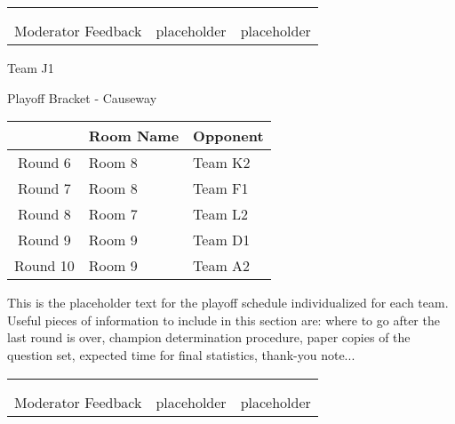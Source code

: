 \documentclass{article}%
\begin{document}
\newline%
%
\begin{tabularx}{\textwidth}{YYY}%
  &  &  \\%
\\%
Moderator Feedback&placeholder&placeholder\\%
\end{tabularx}%
\newpage%
\begin{center}%
\begin{Huge}%
Team J1%
\end{Huge}%
\vspace*{12pt}%
\linebreak%
\begin{Large}%
Playoff Bracket {-} Causeway%
\end{Large}%
\end{center}%
\vspace*{4pt}%
%
\begin{tabularx}{\textwidth}{|c|Y|Y|}%
\hline%
&Room Name&Opponent\\%
\hline%
Round 6&Room 8&Team K2\\%
Round 7&Room 8&Team F1\\%
Round 8&Room 7&Team L2\\%
Round 9&Room 9&Team D1\\%
Round 10&Room 9&Team A2\\%
\hline%
\end{tabularx}%
\vspace*{30pt}%
\linebreak%
This is the placeholder text for the playoff schedule individualized for each team. Useful pieces of information to include in this section are: where to go after the last round is over, champion determination procedure, paper copies of the question set, expected time for final statistics, thank{-}you note...%
\vspace*{30pt}%
\newline%
%
\begin{tabularx}{\textwidth}{YYY}%
  &  &  \\%
\\%
Moderator Feedback&placeholder&placeholder\\%
\end{tabularx}%
\end{document}
